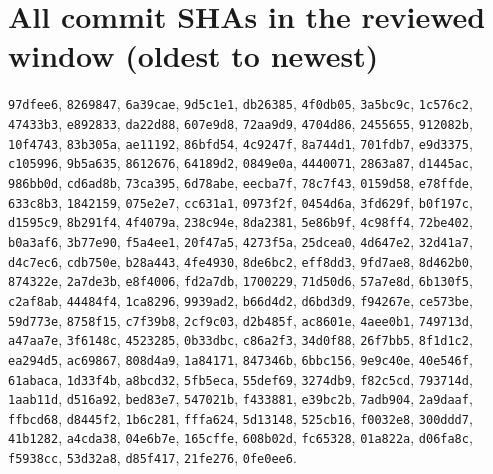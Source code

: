 \documentclass[11pt]{article}
\theoremstyle{definition}
\theoremstyle{remark}
\begin{document}
\appendix
\section{All commit SHAs in the reviewed window (oldest to newest)}\label{app:shas}
{\small\raggedright
\texttt{97dfee6}, \texttt{8269847}, \texttt{6a39cae}, \texttt{9d5c1e1}, \texttt{db26385}, \texttt{4f0db05}, \texttt{3a5bc9c}, \texttt{1c576c2}, \texttt{47433b3}, \texttt{e892833}, \texttt{da22d88}, \texttt{607e9d8}, \texttt{72aa9d9}, \texttt{4704d86}, \texttt{2455655}, \texttt{912082b}, \texttt{10f4743}, \texttt{83b305a}, \texttt{ae11192}, \texttt{86bfd54}, \texttt{4c9247f}, \texttt{8a744d1}, \texttt{701fdb7}, \texttt{e9d3375}, \texttt{c105996}, \texttt{9b5a635}, \texttt{8612676}, \texttt{64189d2}, \texttt{0849e0a}, \texttt{4440071}, \texttt{2863a87}, \texttt{d1445ac}, \texttt{986bb0d}, \texttt{cd6ad8b}, \texttt{73ca395}, \texttt{6d78abe}, \texttt{eecba7f}, \texttt{78c7f43}, \texttt{0159d58}, \texttt{e78ffde}, \texttt{633c8b3}, \texttt{1842159}, \texttt{075e2e7}, \texttt{cc631a1}, \texttt{0973f2f}, \texttt{0454d6a}, \texttt{3fd629f}, \texttt{b0f197c}, \texttt{d1595c9}, \texttt{8b291f4}, \texttt{4f4079a}, \texttt{238c94e}, \texttt{8da2381}, \texttt{5e86b9f}, \texttt{4c98ff4}, \texttt{72be402}, \texttt{b0a3af6}, \texttt{3b77e90}, \texttt{f5a4ee1}, \texttt{20f47a5}, \texttt{4273f5a}, \texttt{25dcea0}, \texttt{4d647e2}, \texttt{32d41a7}, \texttt{d4c7ec6}, \texttt{cdb750e}, \texttt{b28a443}, \texttt{4fe4930}, \texttt{8de6bc2}, \texttt{eff8dd3}, \texttt{9fd7ae8}, \texttt{8d462b0}, \texttt{874322e}, \texttt{2a7de3b}, \texttt{e8f4006}, \texttt{fd2a7db}, \texttt{1700229}, \texttt{71d50d6}, \texttt{57a7e8d}, \texttt{6b130f5}, \texttt{c2af8ab}, \texttt{44484f4}, \texttt{1ca8296}, \texttt{9939ad2}, \texttt{b66d4d2}, \texttt{d6bd3d9}, \texttt{f94267e}, \texttt{ce573be}, \texttt{59d773e}, \texttt{8758f15}, \texttt{c7f39b8}, \texttt{2cf9c03}, \texttt{d2b485f}, \texttt{ac8601e}, \texttt{4aee0b1}, \texttt{749713d}, \texttt{a47aa7e}, \texttt{3f6148c}, \texttt{4523285}, \texttt{0b33dbc}, \texttt{c86a2f3}, \texttt{34d0f88}, \texttt{26f7bb5}, \texttt{8f1d1c2}, \texttt{ea294d5}, \texttt{ac69867}, \texttt{808d4a9}, \texttt{1a84171}, \texttt{847346b}, \texttt{6bbc156}, \texttt{9e9c40e}, \texttt{40e546f}, \texttt{61abaca}, \texttt{1d33f4b}, \texttt{a8bcd32}, \texttt{5fb5eca}, \texttt{55def69}, \texttt{3274db9}, \texttt{f82c5cd}, \texttt{793714d}, \texttt{1aab11d}, \texttt{d516a92}, \texttt{bed83e7}, \texttt{547021b}, \texttt{f433881}, \texttt{e39bc2b}, \texttt{7adb904}, \texttt{2a9daaf}, \texttt{ffbcd68}, \texttt{d8445f2}, \texttt{1b6c281}, \texttt{fffa624}, \texttt{5d13148}, \texttt{525cb16}, \texttt{f0032e8}, \texttt{300ddd7}, \texttt{41b1282}, \texttt{a4cda38}, \texttt{04e6b7e}, \texttt{165cffe}, \texttt{608b02d}, \texttt{fc65328}, \texttt{01a822a}, \texttt{d06fa8c}, \texttt{f5938cc}, \texttt{53d32a8}, \texttt{d85f417}, \texttt{21fe276}, \texttt{0fe0ee6}.
\par}
\end{document}
